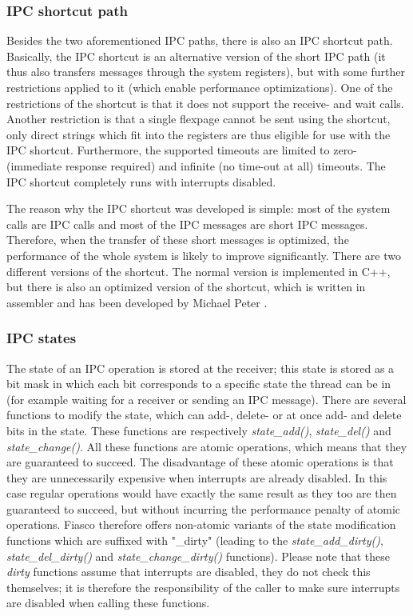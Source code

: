 \subsubsection{IPC shortcut path}
Besides the two aforementioned IPC paths, there is also an IPC shortcut path. Basically, the IPC shortcut is an alternative version of the short IPC path (it thus also transfers messages through the system registers), but with some further restrictions applied to it (which enable performance optimizations). One of the restrictions of the shortcut is that it does not support the receive- and wait calls. Another restriction is that a single flexpage cannot be sent using the shortcut, only direct strings which fit into the registers are thus eligible for use with the IPC shortcut. Furthermore, the supported timeouts are limited to zero- (immediate response required) and infinite (no time-out at all) timeouts. The IPC shortcut completely runs with interrupts disabled. \emptyline

The reason why the IPC shortcut was developed is simple: most of the system calls are IPC calls and most of the IPC messages are short IPC messages. Therefore, when the transfer of these short messages is optimized, the performance of the whole system is likely to improve significantly. There are two different versions of the shortcut. The normal version is implemented in C++, but there is also an optimized version of the shortcut, which is written in assembler and has been developed by Michael Peter \cite{peter02leistung}.

\subsubsection{IPC states}
The state of an IPC operation is stored at the receiver; this state is stored as a bit mask in which each bit corresponds to a specific state the thread can be in (for example waiting for a receiver or sending an IPC message). There are several functions to modify the state, which can add-, delete- or at once add- and delete bits in the state. These functions are respectively \emph{state\_add()}, \emph{state\_del()} and \emph{state\_change()}. All these functions are atomic operations, which means that they are guaranteed to succeed. The disadvantage of these atomic operations is that they are unnecessarily expensive when interrupts are already disabled. In this case regular operations would have exactly the same result as they too are then guaranteed to succeed, but without incurring the performance penalty of atomic operations. Fiasco therefore offers non-atomic variants of the state modification functions which are suffixed with "\_dirty" (leading to the \emph{state\_add\_dirty()}, \emph{state\_del\_dirty()} and \emph{state\_change\_dirty()} functions). Please note that these \textit{dirty} functions assume that interrupts are disabled, they do not check this themselves; it is therefore the responsibility of the caller to make sure interrupts are disabled when calling these functions.

